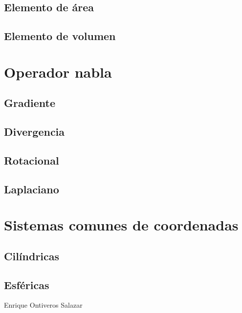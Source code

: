 \documentclass[12pt, fleqn]{report}                             %
\theoremstyle{break}                                            %
\begin{document}
            \subsection{Elemento de área}
            
            \subsection{Elemento de volumen}
            
        \section{Operador nabla}
        
            \subsection{Gradiente}
            
            \subsection{Divergencia}
            
            \subsection{Rotacional}
            
            \subsection{Laplaciano}
            
        \section{Sistemas comunes de coordenadas}
        
            \subsection{Cilíndricas}
            
            \subsection{Esféricas}
            



\begin{thebibliography}{10}

        Enrique Ontiveros Salazar

\end{thebibliography}
\end{document}
